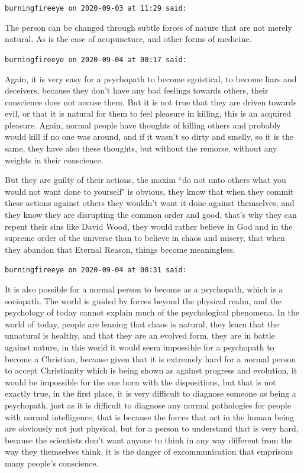 \begin{footnotesize}
\begin{sffamily}
\hfill

\texttt{burningfireeye on 2020-09-03 at 11:29 said: }

The person can be changed through subtle forces of nature that are not merely natural. As is the case of acupuncture, and other forms of medicine.


\hfill

\texttt{burningfireeye on 2020-09-04 at 00:17 said: }

Again, it is very easy for a psychopath to become egoistical, to become liars and deceivers, because they don't have any bad feelings towards others, their conscience does not accuse them. But it is not true that they are driven towards evil, or that it is natural for them to feel pleasure in killing, this is an acquired pleasure. Again, normal people have thoughts of killing others and probably would kill if no one was around, and if it wasn't so dirty and smelly, so it is the same, they have also these thoughts, but without the remorse, without any weights in their conscience.

But they are guilty of their actions, the maxim ``do not unto others what you would not want done to yourself" is obvious, they know that when they commit these actions against others they wouldn't want it done against themselves, and they know they are disrupting the common order and good, that's why they can repent their sins like David Wood, they would rather believe in God and in the supreme order of the universe than to believe in chaos and misery, that when they abandon that Eternal Reason, things become meaningless.


\hfill

\texttt{burningfireeye on 2020-09-04 at 00:31 said: }

It is also possible for a normal person to become as a psychopath, which is a sociopath. The world is guided by forces beyond the physical realm, and the psychology of today cannot explain much of the psychological phenomena. In the world of today, people are leaning that chaos is natural, they learn that the unnatural is healthy, and that they are an evolved form, they are in battle against nature, in this world it would seem impossible for a psychopath to become a Christian, because given that it is extremely hard for a normal person to accept Christianity which is being shown as against progress and evolution, it would be impossible for the one born with the dispositions, but that is not exactly true, in the first place, it is very difficult to diagnose someone as being a psychopath, just as it is difficult to diagnose any normal pathologies for people with normal intelligence, that is because the forces that act in the human being are obviously not just physical, but for a person to understand that is very hard, because the scientists don't want anyone to think in any way different from the way they themselves think, it is the danger of excommunication that emprisons many people's conscience.


\end{sffamily}\end{footnotesize}